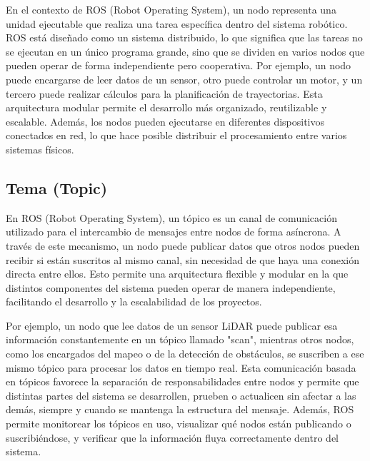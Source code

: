 En el contexto de ROS (Robot Operating System), un nodo representa una unidad ejecutable que realiza una tarea específica dentro del sistema robótico. ROS está diseñado como un sistema distribuido, lo que significa que las tareas no se ejecutan en un único programa grande, sino que se dividen en varios nodos que pueden operar de forma independiente pero cooperativa. Por ejemplo, un nodo puede encargarse de leer datos de un sensor, otro puede controlar un motor, y un tercero puede realizar cálculos para la planificación de trayectorias. Esta arquitectura modular permite el desarrollo más organizado, reutilizable y escalable. Además, los nodos pueden ejecutarse en diferentes dispositivos conectados en red, lo que hace posible distribuir el procesamiento entre varios sistemas físicos. \cite{rosnode2024} 

\subsection{Tema (Topic)}
En ROS (Robot Operating System), un tópico es un canal de comunicación utilizado para el intercambio de mensajes entre nodos de forma asíncrona. A través de este mecanismo, un nodo puede publicar datos que otros nodos pueden recibir si están suscritos al mismo canal, sin necesidad de que haya una conexión directa entre ellos. Esto permite una arquitectura flexible y modular en la que distintos componentes del sistema pueden operar de manera independiente, facilitando el desarrollo y la escalabilidad de los proyectos. 

Por ejemplo, un nodo que lee datos de un sensor LiDAR puede publicar esa información constantemente en un tópico llamado "scan", mientras otros nodos, como los encargados del mapeo o de la detección de obstáculos, se suscriben a ese mismo tópico para procesar los datos en tiempo real. Esta comunicación basada en tópicos favorece la separación de responsabilidades entre nodos y permite que distintas partes del sistema se desarrollen, prueben o actualicen sin afectar a las demás, siempre y cuando se mantenga la estructura del mensaje. Además, ROS permite monitorear los tópicos en uso, visualizar qué nodos están publicando o suscribiéndose, y verificar que la información fluya correctamente dentro del sistema.\cite{rostopic2024}


